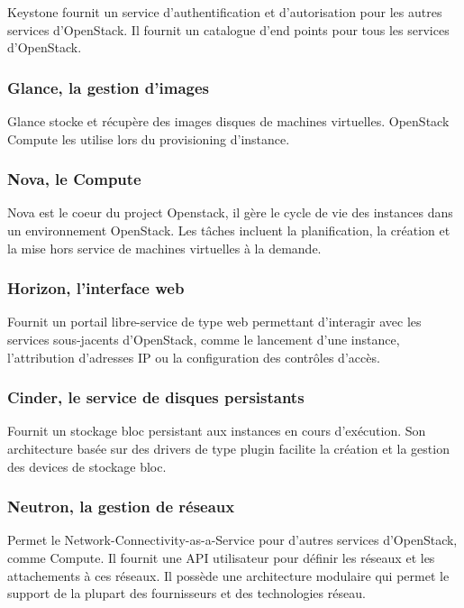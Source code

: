 \documentclass[]{article}
\begin{document}
Keystone fournit un service d'authentification et d'autorisation pour les autres
services d'OpenStack. Il fournit un catalogue d'end points pour tous les
services d'OpenStack.

\subsubsection{Glance, la gestion
d'images}\label{glance-la-gestion-dimages}

Glance stocke et récupère des images disques de machines virtuelles. OpenStack
Compute les utilise lors du provisioning d'instance.

\subsubsection{Nova, le Compute}\label{nova-le-compute}

Nova est le coeur du project Openstack, il gère le cycle de vie des
instances dans un environnement OpenStack. Les tâches incluent la
planification, la création et la mise hors service de machines
virtuelles à la demande.

\subsubsection{Horizon, l'interface web}\label{horizon-linterface-web}

Fournit un portail libre-service de type web permettant d'interagir avec
les services sous-jacents d'OpenStack, comme le lancement d'une
instance, l'attribution d'adresses IP ou la configuration des contrôles
d'accès.

\subsubsection{Cinder, le service de disques
persistants}\label{cinder-le-service-de-disques-persistants}

Fournit un stockage bloc persistant aux instances en cours d'exécution.
Son architecture basée sur des drivers de type plugin facilite la
création et la gestion des devices de stockage bloc.

\subsubsection{Neutron, la gestion de
réseaux}\label{neutron-la-gestion-de-ruxe9seaux}

Permet le Network-Connectivity-as-a-Service pour d'autres services
d'OpenStack, comme Compute. Il fournit une API utilisateur pour définir
les réseaux et les attachements à ces réseaux. Il possède une
architecture modulaire qui permet le support de la plupart des
fournisseurs et des technologies réseau.
\end{document}

